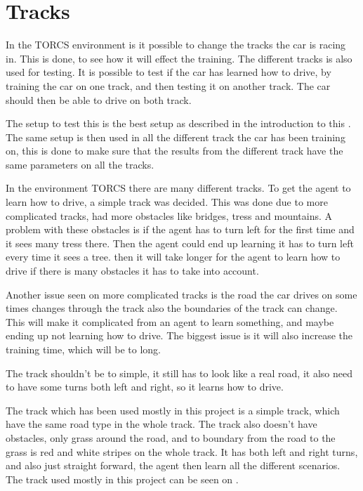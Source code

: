 \section{Tracks}\label{Tracks}
In the TORCS environment is it possible to change the tracks the car is racing in. This is done, to see how it will effect the training. The different tracks is also used for testing. It is possible to test if the car has learned how to drive, by training the car on one track, and then testing it on another track. The car should then be able to drive on both track.  

The setup to test this is the best setup as described in the introduction to this . The same setup is then used in all the different track the car has been training on, this is done to make sure that the results from the different track have the same parameters on all the tracks. 

In the environment TORCS there are many different tracks. To get the agent to learn how to drive, a simple track was decided. This was done due to more complicated tracks, had more obstacles like bridges, tress and mountains. A problem with these obstacles is if the agent has to turn left for the first time and it sees many tress there. Then the agent could end up learning it has to turn left every time it sees a tree. then it will take longer for the agent to learn how to drive if there is many obstacles it has to take into account. 

Another issue seen on more complicated tracks is the road the car drives on some times changes through the track also the boundaries of the track can change. This will make it complicated from an agent to learn something, and maybe ending up not learning how to drive. The biggest issue is it will also increase the training time, which will be to long. 

The track shouldn't be to simple, it still has to look like a real road, it also need to have some turns both left and right, so it learns how to drive. 

The track which has been used mostly in this project is a simple track, which have the same road type in the whole track. The track also doesn't have obstacles, only grass around the road, and to boundary from the road to the grass is red and white stripes on the whole track. It has both left and right turns, and also just straight forward, the agent then learn all the different scenarios. The track used mostly in this project can be seen on .


